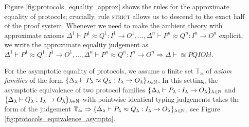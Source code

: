 Figure \ref{fig:protocols_equality_approx} shows the rules for the approximate equality of \ipdl protocols; crucially, rule \textsc{strict} allows us to descend to the exact half of the proof system. Whenever we need to make the ambient theory with approximate axioms $\Delta^1 \vdash P^1 \approx Q^1 : I^1 \to O^1, \ldots, \Delta^n \vdash P^n \approx Q^n : I^n \to O^n$ explicit, we write the approximate equality judgement as $\Delta^1 \vdash P^1 \approx Q^1 : I^1 \to O^1, \ldots, \Delta^n \vdash P^n \approx Q^n : I^n \to O^n \Rightarrow \Delta \vdash \approxeq{P}{Q}{I}{O}{k}{l}$.

\begin{figure*}
\caption{Approximate equality for \ipdl protocols.}
\label{fig:protocols_equality_approx}
\end{figure*}

For the asymptotic equality of \ipdl protocols, we assume a finite set $\mathbb{T}_\approx$ of \emph{axiom families} of the form $\{\Delta_\lambda \vdash P_\lambda \approx Q_\lambda : I_\lambda \to O_\lambda\}_{\lambda \in \mathbb{N}}$. In this setting, the asymptotic equivalence of two protocol families $\{\Delta_\lambda \vdash P_\lambda : I_\lambda \to O_\lambda\}_{\lambda \in \mathbb{N}}$ and $\{\Delta_\lambda \vdash Q_\lambda : I_\lambda \to O_\lambda\}_{\lambda \in \mathbb{N}}$ with pointwise-identical typing judgements takes the form of the judgement $\mathbb{T}_\approx \Rightarrow \{\Delta_\lambda \vdash P_\lambda \approx Q_\lambda : I_\lambda \to O_\lambda\}_{\lambda \in \mathbb{N}}$, see Figure \ref{fig:protocols_equivalence_asympto}.
 
